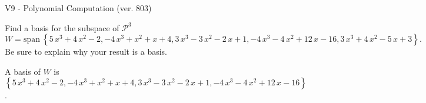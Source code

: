 \begin{exercise}
  \begin{exerciseTitle}V9 - Polynomial Computation (ver. 803)\end{exerciseTitle}
  \begin{exerciseStatement}
    Find a basis for the subspace of \(\mathcal{P}^3\) 
\[W=\mathrm{span}\ \left\{5 \, x^{3} + 4 \, x^{2} - 2 , -4 \, x^{3} + x^{2} + x + 4 , 3 \, x^{3} - 3 \, x^{2} - 2 \, x + 1 , -4 \, x^{3} - 4 \, x^{2} + 12 \, x - 16 , 3 \, x^{3} + 4 \, x^{2} - 5 \, x + 3\right\}.\]
 Be sure to explain why your result is a basis.


  \end{exerciseStatement}
  \begin{exerciseAnswer}
   A basis of \(W\) is  \(\left\{5 \, x^{3} + 4 \, x^{2} - 2 , -4 \, x^{3} + x^{2} + x + 4 , 3 \, x^{3} - 3 \, x^{2} - 2 \, x + 1 , -4 \, x^{3} - 4 \, x^{2} + 12 \, x - 16\right\}\).
  


  \end{exerciseAnswer}
\end{exercise}